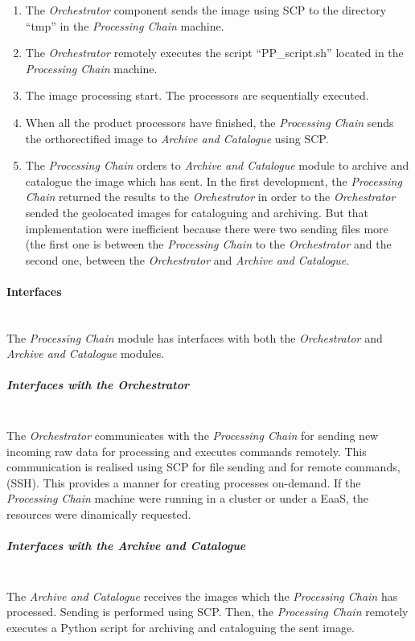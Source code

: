 \begin{enumerate}
\item The \emph{Orchestrator} component sends the image using \ac{SCP} to the
  directory ``tmp'' in the \emph{Processing Chain} machine.
\item The \emph{Orchestrator} remotely executes the script ``PP\_script.sh''
  located in the \emph{Processing Chain} machine.
\item The image processing start. The processors are sequentially executed.
\item When all the product processors have finished, the \emph{Processing Chain}
  sends the orthorectified image to \emph{Archive and Catalogue} using
  \ac{SCP}. 
\item The \emph{Processing Chain} orders to \emph{Archive and Catalogue} module
 to archive and catalogue the image which has sent. In the first development, the
 \emph{Processing Chain} returned the results to the \emph{Orchestrator} in
 order to the \emph{Orchestrator} sended the geolocated images for cataloguing
 and archiving. But that implementation were inefficient because there were two
 sending files more (the first one is between the \emph{Processing Chain} to the
 \emph{Orchestrator} and the second one, between the \emph{Orchestrator} and
 \emph{Archive and Catalogue}.
\end{enumerate}

\paragraph{Interfaces}~\\

The \emph{Processing Chain} module has interfaces with both the \emph{Orchestrator}
and \emph{Archive and Catalogue} modules.
\subparagraph{Interfaces with the Orchestrator}~\\

The \emph{Orchestrator} communicates with the \emph{Processing Chain} for
sending new incoming raw data for processing and executes commands remotely. This communication is realised
using \ac{SCP} for file sending and for remote commands, (\ac{SSH}). This provides a manner for creating processes
on-demand. If the \emph{Processing Chain} machine were running in a cluster or
under a \ac{EaaS}, the
resources were dinamically requested. 

\subparagraph{Interfaces with the Archive and Catalogue}~\\

The \emph{Archive and Catalogue} receives the images which the \emph{Processing
  Chain} has processed. Sending is performed using \ac{SCP}. Then, the
\emph{Processing Chain} remotely executes a Python script for archiving and
cataloguing the sent image.

